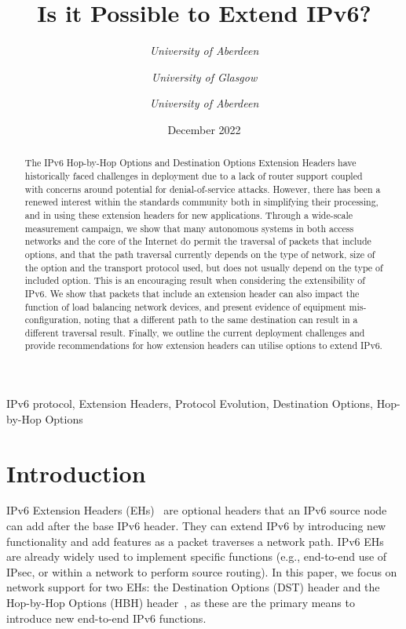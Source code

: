 \documentclass[conference]{IEEEtran}
\title{Is it Possible to Extend IPv6?}
\date{December 2022}
\author{\IEEEauthorblockN{Ana Custura}
\IEEEauthorblockA{
\textit{University of Aberdeen}\\
}
\and
\IEEEauthorblockN{Raffaello Secchi}
\textit{University of Aberdeen}\\
\and
\IEEEauthorblockN{Elizabeth Boswell}
\textit{University of Glasgow}\\
\and
\IEEEauthorblockN{Gorry Fairhurst}
\textit{University of Aberdeen}\\
}
\begin{document}
\maketitle

\begin{abstract}
The IPv6 Hop-by-Hop Options and Destination Options Extension Headers have historically faced challenges in deployment due to a lack of router support coupled with concerns around potential for denial-of-service attacks. However, there has been a renewed interest within the standards community both in simplifying their processing, and in using these extension headers for new applications. 
Through a wide-scale measurement campaign, we show that many autonomous systems in both access networks and the core of the Internet do permit the traversal of packets that include options, and that the path traversal currently depends on the type of network, size of the option and the transport protocol used, but does not usually depend on the type of included option. This is an encouraging result when considering the extensibility of IPv6. We show that packets  that include an extension header can also impact the function of load balancing network devices, and present evidence of equipment mis-configuration, noting that a different path to the same destination can result in a different traversal result. Finally, we outline the current deployment challenges and provide recommendations for how extension headers can utilise options to extend IPv6.

\end{abstract}

\begin{IEEEkeywords}
IPv6 protocol, Extension Headers, Protocol Evolution, Destination Options, Hop-by-Hop Options
\end{IEEEkeywords}

\section{Introduction}
\label{sec:introduction}

IPv6 Extension Headers (EHs)~\cite{rfc8200} are optional headers that an IPv6 source node can add after the base IPv6 header. They can extend IPv6 by introducing new functionality and add features as a packet traverses a network path.  
IPv6 EHs are already widely used to implement specific functions (e.g., end-to-end use of IPsec, or within a network to perform source routing).
In this paper, we focus on network support for two EHs: the Destination Options (DST) header and the Hop-by-Hop Options (HBH) header~\cite{rfc9098}, as these are the primary means to introduce new end-to-end IPv6 functions.
\end{document}
